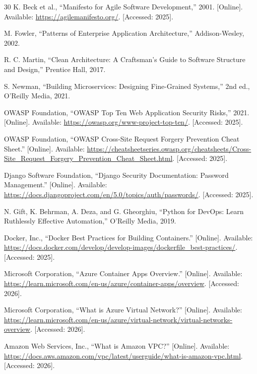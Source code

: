 \begin{thebibliography}{30}
K. Beck et al., ``Manifesto for Agile Software Development,'' 2001. [Online]. Available: \url{https://agilemanifesto.org/}. [Accessed: 2025].

M. Fowler, ``Patterns of Enterprise Application Architecture,'' Addison-Wesley, 2002.

R. C. Martin, ``Clean Architecture: A Craftsman's Guide to Software Structure and Design,'' Prentice Hall, 2017.

S. Newman, ``Building Microservices: Designing Fine-Grained Systems,'' 2nd ed., O'Reilly Media, 2021.

OWASP Foundation, ``OWASP Top Ten Web Application Security Risks,'' 2021. [Online]. Available: \url{https://owasp.org/www-project-top-ten/}. [Accessed: 2025].

OWASP Foundation, ``OWASP Cross-Site Request Forgery Prevention Cheat Sheet.'' [Online]. Available: \url{https://cheatsheetseries.owasp.org/cheatsheets/Cross-Site_Request_Forgery_Prevention_Cheat_Sheet.html}. [Accessed: 2025].

Django Software Foundation, ``Django Security Documentation: Password Management.'' [Online]. Available: \url{https://docs.djangoproject.com/en/5.0/topics/auth/passwords/}. [Accessed: 2025].

N. Gift, K. Behrman, A. Deza, and G. Gheorghiu, ``Python for DevOps: Learn Ruthlessly Effective Automation,'' O'Reilly Media, 2019.

Docker, Inc., ``Docker Best Practices for Building Containers.'' [Online]. Available: \url{https://docs.docker.com/develop/develop-images/dockerfile_best-practices/}. [Accessed: 2025].

Microsoft Corporation, ``Azure Container Apps Overview.'' [Online]. Available: \url{https://learn.microsoft.com/en-us/azure/container-apps/overview}. [Accessed: 2026].

Microsoft Corporation, ``What is Azure Virtual Network?'' [Online]. Available: \url{https://learn.microsoft.com/en-us/azure/virtual-network/virtual-networks-overview}. [Accessed: 2026].

Amazon Web Services, Inc., ``What is Amazon VPC?'' [Online]. Available: \url{https://docs.aws.amazon.com/vpc/latest/userguide/what-is-amazon-vpc.html}. [Accessed: 2026].


\end{thebibliography}
